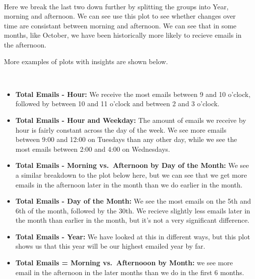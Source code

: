 \documentclass[11pt]{article}
\providecommand{\tightlist}{%
      \setlength{\itemsep}{0pt}\setlength{\parskip}{0pt}}
\begin{document}
    \begin{center}
    \end{center}
    { \hspace*{\fill} \\}
    
    Here we break the last two down further by splitting the groups into
Year, morning and afternoon. We can see use this plot to see whether
changes over time are consistant between morning and afternoon. We can
see that in some months, like October, we have been historically more
likely to recieve emails in the afternoon.

    More examples of plots with insights are shown below.

    \begin{center}
    \end{center}
    { \hspace*{\fill} \\}
    
    \begin{itemize}
\tightlist
\item
  \textbf{Total Emails - Hour:} We receive the most emails between 9 and
  10 o'clock, followed by between 10 and 11 o'clock and between 2 and 3
  o'clock.
\item
  \textbf{Total Emails - Hour and Weekday:} The amount of emails we
  receive by hour is fairly constant across the day of the week. We see
  more emails between 9:00 and 12:00 on Tuesdays than any other day,
  while we see the most emails between 2:00 and 4:00 on Wednesdays.
\item
  \textbf{Total Emails - Morning vs.~Afternoon by Day of the Month:} We
  see a similar breakdown to the plot below here, but we can see that we
  get more emails in the afternoon later in the month than we do earlier
  in the month.
\item
  \textbf{Total Emails - Day of the Month:} We see the most emails on
  the 5th and 6th of the month, followed by the 30th. We recieve
  slightly less emails later in the month than earlier in the month, but
  it's not a very significant difference.
\item
  \textbf{Total Emails - Year:} We have looked at this in different
  ways, but this plot shows us that this year will be our highest
  emailed year by far.
\item
  \textbf{Total Emails = Morning vs.~Afternooon by Month:} we see more
  email in the afternoon in the later months than we do in the first 6
  months.
\end{itemize}
\end{document}
